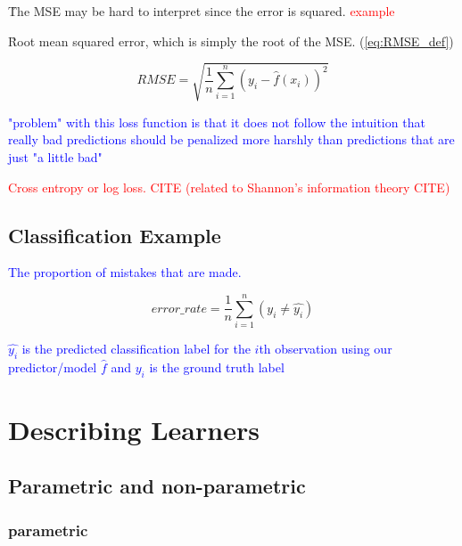 \r{The MSE may be hard to interpret since the error is squared. \textcolor{red}{example}}

\r{Root mean squared error, which is simply the root of the MSE. (\ref{eq:RMSE_def})}

\begin{equation}
{RMSE = \sqrt{\frac{1}{n}\sum_{i=1}^{n}(y_i - \hat{f}(x_i))^2}}
\label{eq:RMSE_def}
\end{equation}

\textcolor{blue}{"problem" with this loss function is that it does not follow the intuition that really bad predictions should be penalized more harshly than predictions that are just "a little bad"}

\textcolor{red}{Cross entropy or log loss. \textcolor{red}{CITE} (related to Shannon's information theory \textcolor{red}{CITE})}




\subsection{Classification Example}

\textcolor{blue}{The proportion of mistakes that are made.}

\begin{equation}
{error\_rate = \frac{1}{n}\sum_{i=1}^{n}(y_i \ne \hat{y_i})}
\label{eq:class_error_rate_def}
\end{equation}

\textcolor{blue}{$\hat{y_i}$ is the predicted classification label for the $i$th observation using our predictor/model $\hat{f}$ and $y_i$ is the ground truth label}

\section{Describing Learners}

\subsection{Parametric and non-parametric}

\subsubsection{parametric}


